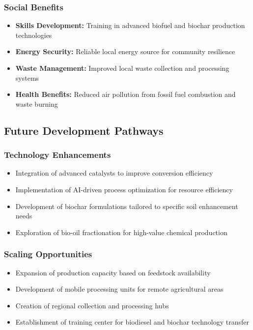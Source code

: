 \subsubsection{Social Benefits}
\begin{itemize}
    \item \textbf{Skills Development:} Training in advanced biofuel and biochar production technologies
    \item \textbf{Energy Security:} Reliable local energy source for community resilience
    \item \textbf{Waste Management:} Improved local waste collection and processing systems
    \item \textbf{Health Benefits:} Reduced air pollution from fossil fuel combustion and waste burning
\end{itemize}

\subsection{Future Development Pathways}

\subsubsection{Technology Enhancements}
\begin{itemize}
    \item Integration of advanced catalysts to improve conversion efficiency
    \item Implementation of AI-driven process optimization for resource efficiency
    \item Development of biochar formulations tailored to specific soil enhancement needs
    \item Exploration of bio-oil fractionation for high-value chemical production
\end{itemize}

\subsubsection{Scaling Opportunities}
\begin{itemize}
    \item Expansion of production capacity based on feedstock availability
    \item Development of mobile processing units for remote agricultural areas
    \item Creation of regional collection and processing hubs
    \item Establishment of training center for biodiesel and biochar technology transfer
\end{itemize}
